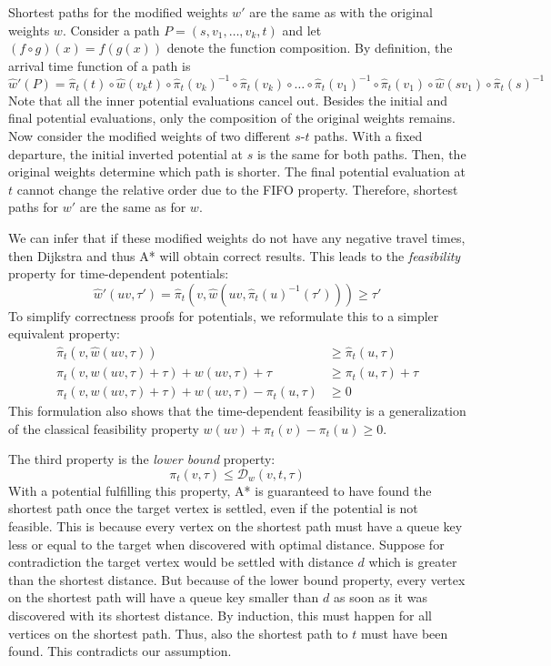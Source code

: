 \documentclass[a4paper,UKenglish,cleveref, autoref, thm-restate,anonymous]{lipics-v2021}
\newcommand*{\dist}{\mathcal{D}}
\begin{document}
Shortest paths for the modified weights $w'$ are the same as with the original weights $w$.
Consider a path $P = (s,v_1,\dots,v_k,t)$ and let $(f \circ g)(x) = f(g(x))$ denote the function composition.
By definition, the arrival time function of a path is
\[
\hat{w}'(P) = \hat{\pi}_t(t) \circ \hat{w}(v_k t) \circ \hat{\pi}_t(v_k)^{-1}
\circ \hat{\pi}_t(v_k) \circ \dots \circ \hat{\pi}_t(v_1)^{-1} \circ
\hat{\pi}_t(v_1) \circ \hat{w}(s v_1) \circ \hat{\pi}_t(s)^{-1}
\]
Note that all the inner potential evaluations cancel out.
Besides the initial and final potential evaluations, only the composition of the original weights remains.
Now consider the modified weights of two different $s$-$t$ paths.
With a fixed departure, the initial inverted potential at $s$ is the same for both paths.
Then, the original weights determine which path is shorter.
The final potential evaluation at $t$ cannot change the relative order due to the FIFO property.
Therefore, shortest paths for $w'$ are the same as for $w$.

We can infer that if these modified weights do not have any negative travel times, then Dijkstra and thus A* will obtain correct results. %
This leads to the \emph{feasibility} property for time-dependent potentials:
\[
\hat{w}'(uv, \tau') = \hat{\pi}_t(v, \hat{w}(uv, \hat{\pi}_t(u)^{-1}(\tau'))) \geq \tau'
\]
To simplify correctness proofs for potentials, we reformulate this to a simpler equivalent property:
\begin{align*}
\hat{\pi}_t(v, \hat{w}(uv, \tau)) & \geq \hat{\pi}_t(u, \tau) \\
\pi_t(v, w(uv, \tau) + \tau) + w(uv, \tau) + \tau & \geq \pi_t(u, \tau) + \tau \\
\pi_t(v, w(uv, \tau) + \tau) + w(uv, \tau) - \pi_t(u, \tau) & \geq 0
\end{align*}
This formulation also shows that the time-dependent feasibility is a generalization of the classical feasibility property $w(uv) + \pi_t(v) - \pi_t(u) \geq 0$.

The third property is the \emph{lower bound} property:
\[
\pi_t(v, \tau) \leq \dist_w(v,t,\tau)
\]
With a potential fulfilling this property, A* is guaranteed to have found the shortest path once the target vertex is settled, even if the potential is not feasible.
This is because every vertex on the shortest path must have a queue key less or equal to the target when discovered with optimal distance.
Suppose for contradiction the target vertex would be settled with distance $d$ which is greater than the shortest distance.
But because of the lower bound property, every vertex on the shortest path will have a queue key smaller than $d$ as soon as it was discovered with its shortest distance.
By induction, this must happen for all vertices on the shortest path.
Thus, also the shortest path to $t$ must have been found.
This contradicts our assumption.
\end{document}
